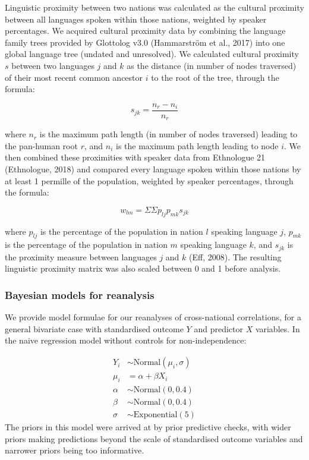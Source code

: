 \documentclass[english,man,floatsintext]{apa6}
\begin{document}
Linguistic proximity between two nations was calculated as the cultural proximity between all languages spoken within those nations, weighted by speaker percentages. We acquired cultural proximity data by combining the language family trees provided by Glottolog v3.0 (Hammarström et al., 2017) into one global language tree (undated and unresolved). We calculated cultural proximity \(s\) between two languages \(j\) and \(k\) as the distance (in number of nodes traversed) of their most recent common ancestor \(i\) to the root of the tree, through the formula:

\[
s_{jk} = \frac{n_{r}-n_{i}}{n_{r}}
\]

where \(n_{r}\) is the maximum path length (in number of nodes traversed) leading to the pan-human root \(r\), and \(n_{i}\) is the maximum path length leading to node \(i\). We then combined these proximities with speaker data from Ethnologue 21 (Ethnologue, 2018) and compared every language spoken within those nations by at least 1 permille of the population, weighted by speaker percentages, through the formula:

\[
w_{lm} = {\Sigma}{\Sigma}p_{lj}p_{mk}s_{jk}
\]

where \(p_{lj}\) is the percentage of the population in nation \(l\) speaking language \(j\), \(p_{mk}\) is the percentage of the population in nation \(m\) speaking language \(k\), and \(s_{jk}\) is the proximity measure between languages \(j\) and \(k\) (Eff, 2008). The resulting linguistic proximity matrix was also scaled between 0 and 1 before analysis.

\hypertarget{bayesian-models-for-reanalysis}{%
\subsubsection{Bayesian models for reanalysis}\label{bayesian-models-for-reanalysis}}

We provide model formulae for our reanalyses of cross-national correlations, for a general bivariate case with standardised outcome \(Y\) and predictor \(X\) variables. In the naive regression model without controls for non-independence:

\[
\begin{aligned}
Y_{i} &\sim \text{Normal}(\mu_{i},\sigma) \\
\mu_{i} &= \alpha + \beta X_{i} \\
\alpha &\sim \text{Normal}(0, 0.4) \\
\beta &\sim \text{Normal}(0, 0.4) \\
\sigma &\sim \text{Exponential}(5)
\end{aligned}
\]
The priors in this model were arrived at by prior predictive checks, with wider priors making predictions beyond the scale of standardised outcome variables and narrower priors being too informative.
\end{document}
